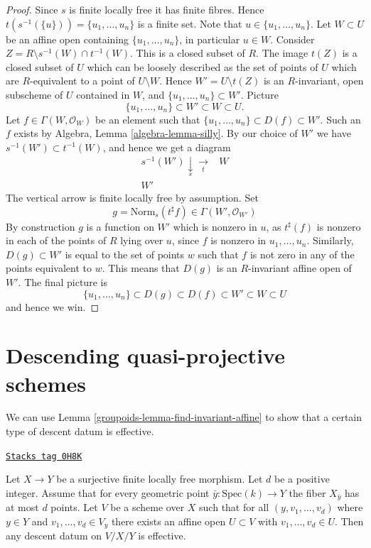 \begin{proof}
Since $s$ is finite locally free it has finite fibres. Hence
$t(s^{-1}(\{u\})) = \{u_1, \ldots, u_n\}$ is a finite set.
Note that $u \in \{u_1, \ldots, u_n\}$.
Let $W \subset U$ be an affine open containing $\{u_1, \ldots, u_n\}$,
in particular $u \in W$. Consider
$Z = R \setminus s^{-1}(W) \cap t^{-1}(W)$. This is a closed subset
of $R$. The image $t(Z)$ is a closed subset of $U$ which can be loosely
described as the set of points of $U$ which are $R$-equivalent to a point
of $U \setminus W$. Hence $W' = U \setminus t(Z)$ is an $R$-invariant, open
subscheme of $U$ contained in $W$, and $\{u_1, \ldots, u_n\} \subset W'$.
Picture
$$
\{u_1, \ldots, u_n\} \subset W' \subset W \subset U.
$$
Let $f \in \Gamma(W, \mathcal{O}_W)$ be an element such that
$\{u_1, \ldots, u_n\} \subset D(f) \subset W'$. Such an $f$ exists by
Algebra, Lemma \ref{algebra-lemma-silly}. By our choice of $W'$ we
have $s^{-1}(W') \subset t^{-1}(W)$, and hence we get a diagram
$$
\begin{array}{cc}s^{-1}(W') \underset{s}{\downarrow}\underset{t}{\longrightarrow} & W \\ W' & \end{array}
$$
The vertical arrow is finite locally free by assumption. Set
$$
g = \text{Norm}_s(t^\sharp f) \in \Gamma(W', \mathcal{O}_{W'})
$$
By construction $g$ is a function on $W'$ which is
nonzero in $u$, as $t^\sharp(f)$ is nonzero in each of the points of
$R$ lying over $u$, since $f$ is nonzero in $u_1, \ldots, u_n$.
Similarly, $D(g) \subset W'$ is equal to the
set of points $w$ such that $f$ is not zero in any of the points
equivalent to $w$. This means that $D(g)$ is an
$R$-invariant affine open of $W'$. The final picture is
$$
\{u_1, \ldots, u_n\} \subset D(g) \subset D(f) \subset W' \subset W \subset U
$$
and hence we win.
\end{proof}

\section{Descending quasi-projective schemes}
\label{groupoids-section-quasi-projective}
We can use Lemma \ref{groupoids-lemma-find-invariant-affine}
to show that a certain type of descent datum is effective.

\begin{lemma}
\label{groupoids-lemma-descend-along-finite-with-bound}
\href{https://stacks.math.columbia.edu/tag/0H8K}{\texttt{Stacks tag 0H8K}}

Let $X \to Y$ be a surjective finite locally free morphism.
Let $d$ be a positive integer. Assume that for every geometric
point $\bar{y} : \mathrm{Spec}(k) \to Y$ the fiber $X_{\bar{y}}$
has at most $d$ points.
Let $V$ be a scheme over $X$ such that for all
$(y, v_1, \ldots, v_d)$ where $y \in Y$ and
$v_1, \ldots, v_d \in V_y$ there exists an affine open
$U \subset V$ with $v_1, \ldots, v_d \in U$.
Then any descent datum on $V/X/Y$ is effective.
\end{lemma}

